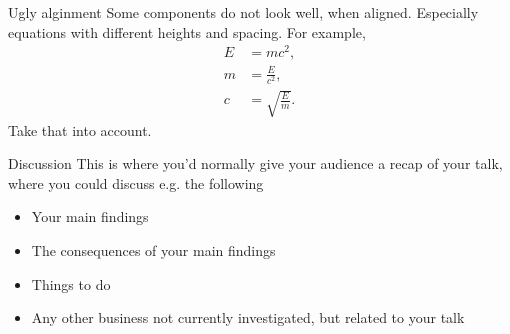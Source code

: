 \documentclass[aspectratio=169]{beamer}
\begin{document}
\begin{frame}{Ugly alginment}
Some components do not look well, when aligned. Especially equations with different heights and spacing. For example,
\begin{align}
E &= mc^2,\\
m &= \frac{E}{c^2},\\
c &= \sqrt{\frac{E}{m}}.
\end{align}
Take that into account.
\end{frame}

\begin{frame}{Discussion}
This is where you'd normally give your audience a recap of your talk, where you could discuss e.g. the following
\begin{itemize}
\item Your main findings
\item The consequences of your main findings
\item Things to do
\item Any other business not currently investigated, but related to your talk
\end{itemize}
\end{frame}
\end{document}

